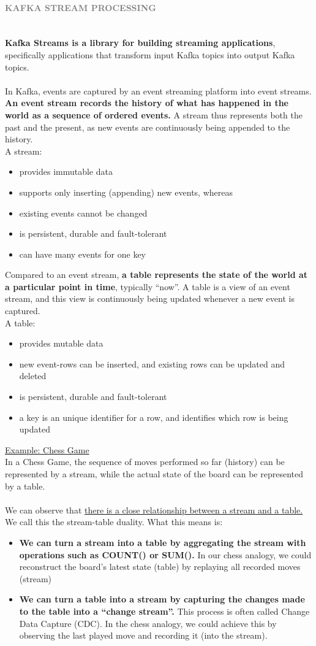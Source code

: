 \documentclass[10pt,a4paper]{article}
\newcommand{\nline}{\\~\\}
\newcommand{\myparagraph}[1]{\paragraph{\normalsize{\textcolor{gray}{\uppercase{\textbf{#1}}}} }\mbox{} \vspace{0.5em}\\}
\begin{document}
\myparagraph{Kafka Stream Processing}
\textbf{Kafka Streams is a library for building streaming applications}, specifically applications that transform input Kafka topics into output Kafka topics. 
\nline
In Kafka, events are captured by an event streaming platform into event streams. \textbf{An event stream records the history of what has happened in the world as a sequence of ordered events.} A stream thus represents both the past and the present, as new events are continuously being appended to the history. \\
A stream:
\begin{itemize}
	\item provides immutable data
	\item supports only inserting (appending) new events, whereas 	\item existing events cannot be changed
	\item is persistent, durable and fault-tolerant
	\item can have many events for one key
\end{itemize}
Compared to an event stream, \textbf{a table represents the state of the world at a particular point in time}, typically “now”. A table is a view of an event stream, and this view is continuously being updated whenever a new event is captured. \\
A table: 
\begin{itemize}
	\item provides mutable data
	\item new event-rows can be inserted, and existing rows can be updated and deleted
	\item is persistent, durable and fault-tolerant
	\item a key is an unique identifier for a row, and identifies which row is being updated
\end{itemize}
\uline{Example: Chess Game} \\
In a Chess Game, the sequence of moves performed so far (history) can be represented by a stream, while the actual state of the board can be represented by a table.
\nline
We can observe that \uline{there is a close relationship between a stream and a table.} We call this the stream-table duality. What this means is:
\begin{itemize}
	\item \textbf{We can turn a stream into a table by aggregating the stream with operations such as COUNT() or SUM().} In our chess analogy, we could reconstruct the board’s latest state (table) by replaying all recorded moves (stream)
	\item \textbf{We can turn a table into a stream by capturing the changes made to the table into a “change stream”.} This process is often called Change Data Capture (CDC). In the chess analogy, we could achieve this by observing the last played move and recording it (into the stream).
\end{itemize}
\end{document}
